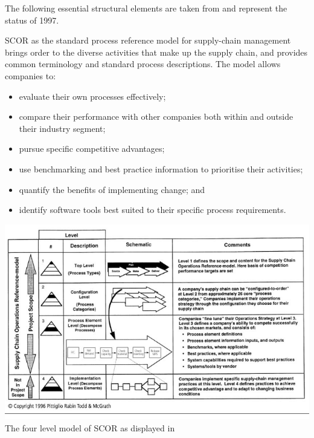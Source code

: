 \documentclass[11pt,a4paper]{article}
\begin{document}
The following essential structural elements are taken from \cite{Stewart1997}
and represent the status of 1997.

SCOR as the standard process reference model for supply-chain management
brings order to the diverse activities that make up the supply chain, and
provides common terminology and standard process descriptions. The model
allows companies to:
\begin{itemize}
\item evaluate their own processes effectively;
\item compare their performance with other companies both within and outside
  their industry segment;
\item pursue specific competitive advantages;
\item use benchmarking and best practice information to prioritise their
  activities;
\item quantify the benefits of implementing change; and
\item identify software tools best suited to their specific process
  requirements.
\end{itemize}

\begin{center}
  \includegraphics[width=.9\textwidth]{Stewart-1997.png}\\
  The four level model of SCOR as displayed in \cite{Stewart1997}
\end{center}
\end{document}
